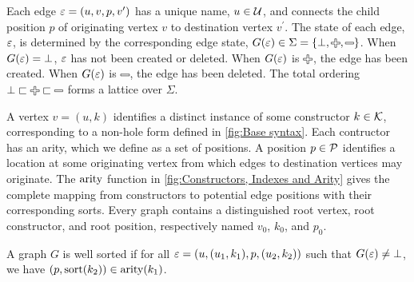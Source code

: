 Each edge $\e = (u, v, p, v^\prime)$ has a unique name, $u \in \U$, and connects
the child position $p$ of originating vertex $v$ to destination vertex
$v^\prime$. The state of each edge, $\e$, is determined by the corresponding
edge state, $G(\e) \in \Sigma = \{ \bot, \Plus, \Minus \}$. When $G(\e) = \bot$,
$\e$ has not been created or deleted. When $G(\e)$ is $\Plus$, the edge has been
created. When $G(\e)$ is $\Minus$, the edge has been deleted. The total
ordering $\bot \sqsubset \Plus \sqsubset \Minus$ forms a lattice over $\Sigma$.

A vertex $v = (u, k)$ identifies a distinct instance of some constructor $k \in
\K$, corresponding to a non-hole form defined in \autoref{fig:Base syntax}. Each
contructor has an arity, which we define as a set of positions. A position $p
\in \P$ identifies a location at some originating vertex from which edges to
destination vertices may originate. The $\arity$ function in
\autoref{fig:Constructors, Indexes and Arity} gives the complete mapping from
constructors to potential edge positions with their corresponding sorts. Every
graph contains a distinguished root vertex, root constructor, and root position,
respectively named $v_0$, $k_0$, and $p_0$.

\vspace*{\baselineskip}



A graph $G$ is well sorted if
for all $\e = (u, (u_1, k_1), p, (u_2, k_2))$
such that $G(\e) \neq \bot$,
we have $(p, \sort(k_2)) \in \arity(k_1)$.




